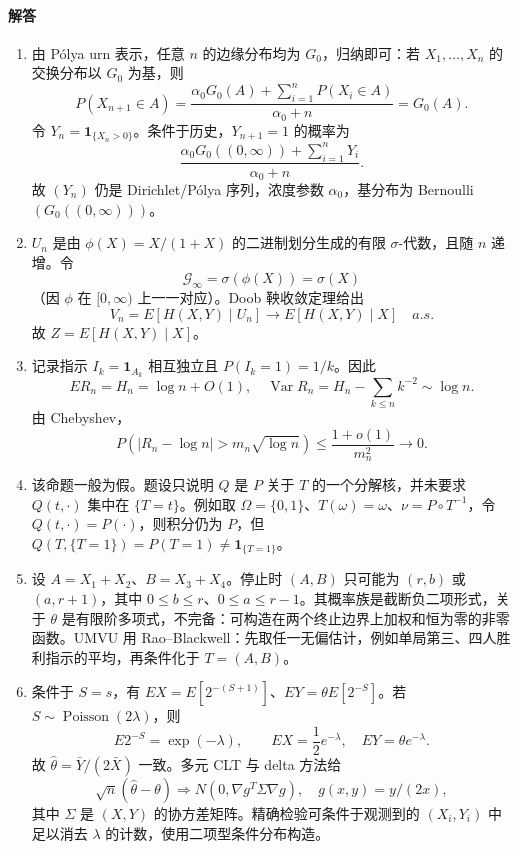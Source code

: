 \documentclass[UTF8,12pt]{ctexart}
\begin{document}
\paragraph{解答}
\begin{enumerate}[label=\textbf{\arabic*.},leftmargin=2.2em]
\item 由 Pólya urn 表示，任意 \(n\) 的边缘分布均为 \(G_0\)，归纳即可：若 \(X_1,\ldots,X_n\) 的交换分布以 \(G_0\) 为基，则
\[
P(X_{n+1}\in A)=\frac{\alpha_0G_0(A)+\sum_{i=1}^nP(X_i\in A)}{\alpha_0+n}=G_0(A).
\]
令 \(Y_n=\mathbf1_{\{X_n>0\}}\)。条件于历史，\(Y_{n+1}=1\) 的概率为
\[
\frac{\alpha_0G_0((0,\infty))+\sum_{i=1}^nY_i}{\alpha_0+n}.
\]
故 \((Y_n)\) 仍是 Dirichlet/Pólya 序列，浓度参数 \(\alpha_0\)，基分布为 Bernoulli\((G_0((0,\infty)))\)。

\item \(U_n\) 是由 \(\phi(X)=X/(1+X)\) 的二进制划分生成的有限 \(\sigma\)-代数，且随 \(n\) 递增。令
\[
\mathcal G_\infty=\sigma(\phi(X))=\sigma(X)
\]
（因 \(\phi\) 在 \([0,\infty)\) 上一一对应）。Doob 鞅收敛定理给出
\[
V_n=E[H(X,Y)\mid U_n]\to E[H(X,Y)\mid X]\quad a.s.
\]
故 \(Z=E[H(X,Y)\mid X]\)。

\item 记录指示 \(I_k=\mathbf1_{A_k}\) 相互独立且 \(P(I_k=1)=1/k\)。因此
\[
E R_n=H_n=\log n+O(1),\quad \operatorname{Var}R_n=H_n-\sum_{k\le n}k^{-2}\sim\log n.
\]
由 Chebyshev，
\[
P(|R_n-\log n|>m_n\sqrt{\log n})\le \frac{1+o(1)}{m_n^2}\to0.
\]

\item 该命题一般为假。题设只说明 \(Q\) 是 \(P\) 关于 \(T\) 的一个分解核，并未要求 \(Q(t,\cdot)\) 集中在 \(\{T=t\}\)。例如取 \(\Omega=\{0,1\}\)、\(T(\omega)=\omega\)、\(\nu=P\circ T^{-1}\)，令 \(Q(t,\cdot)=P(\cdot)\)，则积分仍为 \(P\)，但 \(Q(T,\{T=1\})=P(T=1)\ne\mathbf1_{\{T=1\}}\)。

\item 设 \(A=X_1+X_2\)、\(B=X_3+X_4\)。停止时 \((A,B)\) 只可能为 \((r,b)\) 或 \((a,r+1)\)，其中 \(0\le b\le r\)、\(0\le a\le r-1\)。其概率族是截断负二项形式，关于 \(\theta\) 是有限阶多项式，不完备：可构造在两个终止边界上加权和恒为零的非零函数。UMVU 用 Rao--Blackwell：先取任一无偏估计，例如单局第三、四人胜利指示的平均，再条件化于 \(T=(A,B)\)。

\item 条件于 \(S=s\)，有 \(E X=E[2^{-(S+1)}]\)、\(EY=\theta E[2^{-S}]\)。若 \(S\sim\operatorname{Poisson}(2\lambda)\)，则
\[
E2^{-S}=\exp(-\lambda),\qquad E X=\frac12e^{-\lambda},\quad EY=\theta e^{-\lambda}.
\]
故 \(\hat\theta=\bar Y/(2\bar X)\) 一致。多元 CLT 与 delta 方法给
\[
\sqrt n(\hat\theta-\theta)\Rightarrow N(0,\nabla g^T\Sigma\nabla g),
\quad g(x,y)=y/(2x),
\]
其中 \(\Sigma\) 是 \((X,Y)\) 的协方差矩阵。精确检验可条件于观测到的 \((X_i,Y_i)\) 中足以消去 \(\lambda\) 的计数，使用二项型条件分布构造。
\end{enumerate}
\end{document}
